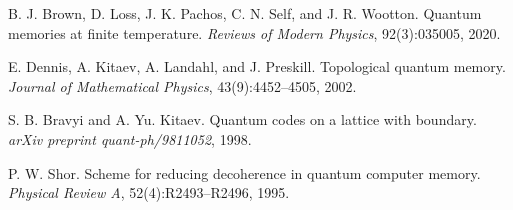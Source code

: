 \documentclass[12pt]{article}
\begin{document}
\begin{thebibliography}{99}
B. J. Brown, D. Loss, J. K. Pachos, C. N. Self, and J. R. Wootton.
\newblock Quantum memories at finite temperature.
\newblock \emph{Reviews of Modern Physics}, 92(3):035005, 2020.

E. Dennis, A. Kitaev, A. Landahl, and J. Preskill.
\newblock Topological quantum memory.
\newblock \emph{Journal of Mathematical Physics}, 43(9):4452--4505, 2002.

S. B. Bravyi and A. Yu. Kitaev.
\newblock Quantum codes on a lattice with boundary.
\newblock \emph{arXiv preprint quant-ph/9811052}, 1998.

P. W. Shor.
\newblock Scheme for reducing decoherence in quantum computer memory.
\newblock \emph{Physical Review A}, 52(4):R2493--R2496, 1995.

\end{thebibliography}
\end{document}

